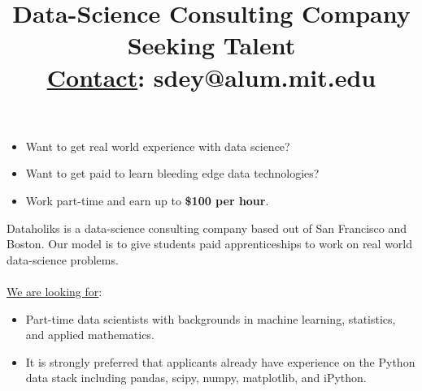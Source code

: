 \documentclass[11pt]{article}
\begin{document}

\begin{titlepage}


\thispagestyle{empty}

\vspace{-1in}

\title{\vspace{-0.5in} Data-Science Consulting Company Seeking Talent\\
	{\underline{Contact}: sdey@alum.mit.edu}}%
\date{}
\maketitle
%
\vspace{-0.75in}

\begin{Large}

\begin{itemize}
	\item Want to get real world experience with data science?
	\item Want to get paid to learn bleeding edge data technologies? 
	\item Work part-time and earn up to \textbf{\$100 per hour}.  
\end{itemize}

\end{Large}

\noindent Dataholiks is a data-science consulting company based out of San Francisco and Boston. Our model is to give students paid apprenticeships to work on real world data-science problems. 
\\
\\
\noindent \underline{We are looking for}:
\begin{itemize}
	\item Part-time data scientists with backgrounds in machine learning, statistics, and applied mathematics.  
	\item It is strongly preferred that applicants already have experience on the Python data stack including pandas, scipy, numpy, matplotlib, and iPython. 
\end{itemize}


\end{titlepage}
\end{document}
